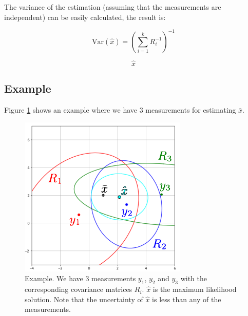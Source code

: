 \documentclass{article}
\begin{document}
The variance of the estimation (assuming that the measurements are independent) can be easily calculated, the result is:

\begin{equation}
    \boxed{\text{Var}(\hat{x}) = \left( \sum_{i=1}^{k} R^{-1}_i \right)^{-1}}
\end{equation}

\begin{equation}
    \hat{x}
\end{equation}

\subsection{Example}

Figure \ref{fig:1} shows an example where we have 3 measurements for estimating $\bar{x}$.

\begin{figure}
    \centering
    \includegraphics[scale=0.6]{pic1.png}
    \caption{Example. We have 3 measurements $y_1$, $y_2$ and $y_3$ with the corresponding covariance matrices $R_i$. $\hat{x}$ is the maximum likelihood solution. Note that the uncertainty of $\hat{x}$ is less than any of the measurements.}
    \label{fig:1}
\end{figure}
\end{document}
